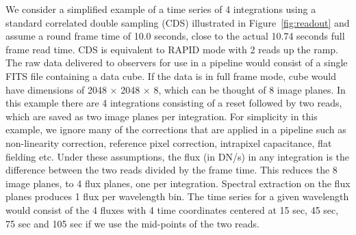\documentclass[iop]{emulateapj}
\begin{document}
We consider a simplified example of a time series of 4 integrations using a standard correlated double sampling (CDS) illustrated in Figure~\ref{fig:readout} and assume a round frame time of 10.0 seconds, close to the actual 10.74 seconds full frame read time.
CDS is equivalent to RAPID mode with 2 reads up the ramp.
The raw data delivered to observers for use in a pipeline would consist of a single FITS file containing a data cube.
If the data is in full frame mode, cube would have dimensions of 2048 $\times$ 2048 $\times$ 8, which can be thought of 8 image planes.
In this example there are 4 integrations consisting of a reset followed by two reads, which are saved as two image planes per integration.	
For simplicity in this example, we ignore many of the corrections that are applied in a pipeline such as non-linearity correction, reference pixel correction, intrapixel capacitance, flat fielding etc.
Under these assumptions, the flux (in DN/s) in any integration is the difference between the two reads divided by the frame time.
This reduces the 8 image planes, to 4 flux planes, one per integration.
Spectral extraction on the flux planes \citep[e.g.][]{horne1986optimalE} produces 1 flux per wavelength bin.
The time series for a given wavelength would consist of the 4 fluxes with 4 time coordinates centered at 15 sec, 45 sec, 75 sec and 105 sec if we use the mid-points of the two reads.
\end{document}

